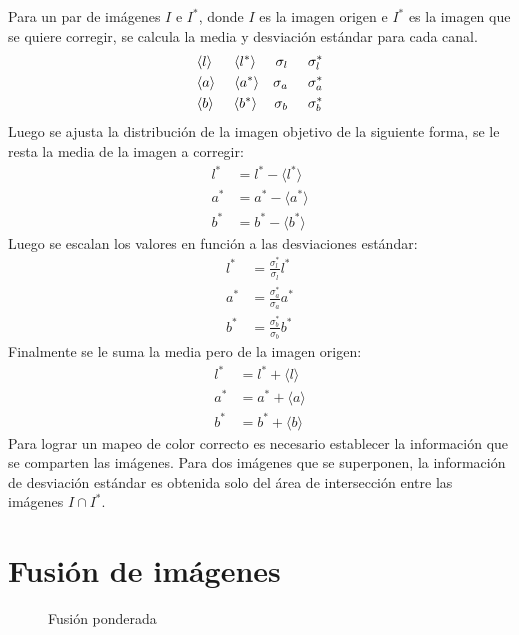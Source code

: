 Para un par de imágenes $I$ e $I^*$, donde $I$ es la imagen origen e $I^*$ es la imagen que se quiere corregir, se calcula la media y desviación estándar para cada canal.
\begin{align*}
&{\langle l \rangle} \hspace{0.55cm} {\langle l^* \rangle}  &{ \sigma_l } \hspace{0.5cm} { \sigma^*_l } \\
&{\langle a \rangle} \hspace{0.48cm} {\langle a^* \rangle}  &{ \sigma_a } \hspace{0.5cm} { \sigma^*_a }  \\
&{\langle b \rangle} \hspace{0.5cm} {\langle b^* \rangle}  &{ \sigma_b } \hspace{0.5cm} { \sigma^*_b } 
\end{align*}
Luego se ajusta la distribución de la imagen objetivo de la siguiente forma, se le resta la media de la imagen a corregir:
\begin{align*}
l^* &= l^* - \langle l^* \rangle \\
a^* &= a^* - \langle a^* \rangle \\
b^* &= b^* - \langle b^* \rangle
\end{align*}
Luego se escalan los valores en función a las desviaciones estándar:
\begin{align*}
l^* &= \frac{\sigma^*_l}{\sigma_l} l^* \\
a^* &= \frac{\sigma^*_a}{\sigma_a} a^* \\
b^* &= \frac{\sigma^*_b}{\sigma_b} b^*
\end{align*}
Finalmente se le suma la media pero de la imagen origen:
\begin{align*}
l^* &= l^* + \langle l \rangle \\
a^* &= a^* + \langle a \rangle \\
b^* &= b^* + \langle b \rangle
\end{align*}
Para lograr un mapeo de color correcto es necesario establecer la información que se comparten las imágenes. Para dos imágenes que se superponen, la información de desviación estándar es obtenida solo del área de intersección entre las imágenes $I\cap I^*$.


\section{Fusión de imágenes}

\begin{figure}[h]
	\centering     %
	\vspace{-0.3cm}
	
	
	\caption[Tipos básicos de fusión]{Fusión ponderada}
	\label{imagen:blend-types}
\end{figure}

